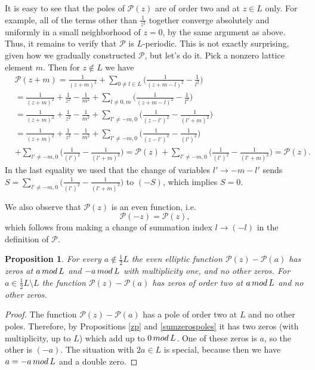\documentclass[11pt]{article}
\numberwithin{equation}{section}
\numberwithin{footnote}{section}
\newtheorem{prop}[thm]{Proposition}
\begin{document}
\smallskip
It is easy to see that the poles of $\mathcal P(z)$ are of order two and at $z\in L$ only. For example, all of the terms other than $\frac 1{z^2}$ together converge absolutely and uniformly in a small neighborhood of $z=0$, by the same argument as above. Thus, it remains to verify that $\mathcal P$ is $L$-periodic. This is not exactly surprising, given how we gradually constructed $\mathcal P$, but let's do it. Pick a nonzero lattice element $m$. Then for $z\not\in L$ we have
\begin{align*}
&\mathcal P(z+m)
 = \frac 1{(z+m)^2} + \sum_{0\neq l\in L} \Big( \frac 1{(z+m-l)^2 }-\frac 1{l^2}\Big)
 \\&
 =\frac 1{(z+m)^2} + \frac 1{z^2} - \frac 1{m^2}  + \sum_{l\neq 0,m} \Big( \frac 1{(z+m-l)^2 }-\frac 1{l^2}\Big)
 \\&
 =\frac 1{(z+m)^2} + \frac 1{z^2} - \frac 1{m^2}  + \sum_{l'\neq -m,0} \Big( \frac 1{(z-l')^2 }-\frac 1{(l'+m)^2}\Big)
 \\&
 =
 \frac 1{(z+m)^2} + \frac 1{z^2} - \frac 1{m^2}  + \sum_{l'\neq -m,0} \Big( \frac 1{(z-l')^2 }-\frac 1{(l')^2}\Big)
  \\&
  + \sum_{l'\neq -m,0} \Big( \frac 1{(l')^2 }-\frac 1{(l'+m)^2}\Big)
 =\mathcal P(z) 
 + \sum_{l'\neq -m,0} \Big( \frac 1{(l')^2 }-\frac 1{(l'+m)^2}\Big) = \mathcal P(z).
\end{align*}
In the last equality we used that the change of variables $l'\to -m-l'$ sends 
$S= \sum_{l'\neq -m,0} \Big( \frac 1{(l')^2 }-\frac 1{(l'+m)^2}\Big)$ to $(-S)$, which implies $S=0$.


We also observe that $\mathcal P(z)$ is an even function, i.e. 
$$\mathcal P(-z)=\mathcal P(z),$$
which follows from making a change of summation index $l\to (-l)$ in the definition of $\mathcal P$.

\smallskip
\begin{prop}\label{valP}
For every $a\not\in \frac 12 L$ the even elliptic function $\mathcal P(z) -\mathcal P(a)$ has zeros at $a \,{\rm mod} \,L$ and $-a\, {\rm mod} \,L$ with multiplicity one, and no other zeros. For $a\in \frac 12 L \setminus L$ the function $\mathcal P(z) -\mathcal P(a)$ has zeros of order two at  $a\,{\rm mod}\, L$ and no other zeros.
\end{prop}

\begin{proof}
The function $\mathcal P(z) -\mathcal P(a)$ has a pole of order two at $L$ and no other poles. Therefore, by Propositions \ref{zp} and \ref{sumzerospoles} it has two zeros (with multiplicity, up to $L$) which add up to $0\,{\rm mod} \,L$. One of these zeros is $a$, so the other is $(-a)$. The situation with $2a\in L$ is special, because then we have $a=-a\,{\rm mod}\,L$ and a double zero.
\end{proof}
\end{document}
